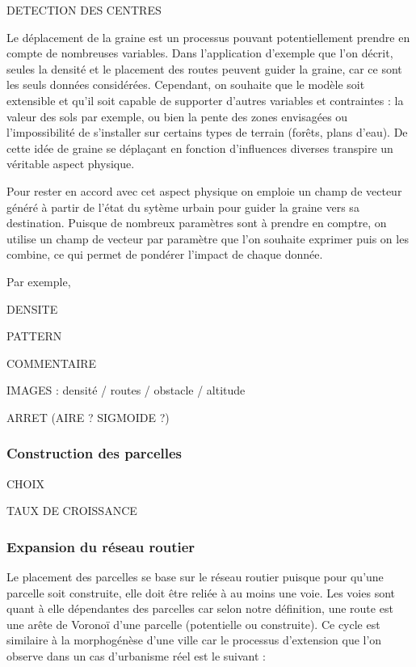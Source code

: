 \documentclass[12pt]{article}
\begin{document}
DETECTION DES CENTRES

Le déplacement de la graine est un processus pouvant potentiellement
prendre en compte de nombreuses variables. Dans l'application
d'exemple que l'on décrit, seules la densité et le placement des
routes peuvent guider la graine, car ce sont les seuls données
considérées. Cependant, on souhaite que le modèle soit extensible et
qu'il soit capable de supporter d'autres variables et contraintes : la
valeur des sols par exemple, ou bien la pente des zones envisagées ou
l'impossibilité de s'installer sur certains types de terrain (forêts,
plans d'eau). De cette idée de graine se déplaçant en fonction
d'influences diverses transpire un véritable aspect physique.

Pour rester en accord avec cet aspect physique on emploie un champ de
vecteur généré à partir de l'état du sytème urbain pour guider la
graine vers sa destination. Puisque de nombreux paramètres sont à
prendre en comptre, on utilise un champ de vecteur par paramètre que
l'on souhaite exprimer puis on les combine, ce qui permet de pondérer
l'impact de chaque donnée.

Par exemple,

DENSITE

PATTERN

COMMENTAIRE

IMAGES : densité / routes / obstacle / altitude

ARRET (AIRE ? SIGMOIDE ?)

\subsubsection{Construction des parcelles}

CHOIX

TAUX DE CROISSANCE

\subsubsection{Expansion du réseau routier}

Le placement des parcelles se base sur le réseau routier puisque pour
qu'une parcelle soit construite, elle doit être reliée à au moins une
voie. Les voies sont quant à elle dépendantes des parcelles car selon
notre définition, une route est une arête de Voronoï d'une parcelle
(potentielle ou construite). Ce cycle est similaire à la morphogénèse
d'une ville car le processus d'extension que l'on observe dans un cas
d'urbanisme réel est le suivant :
\end{document}
